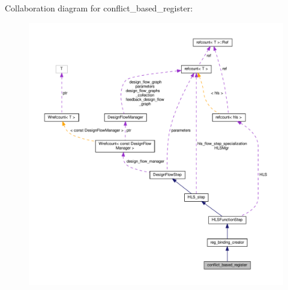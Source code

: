 Collaboration diagram for conflict\+\_\+based\+\_\+register\+:
\nopagebreak
\begin{figure}[H]
\begin{center}
\leavevmode
\includegraphics[width=350pt]{d1/d71/classconflict__based__register__coll__graph}
\end{center}
\end{figure}
